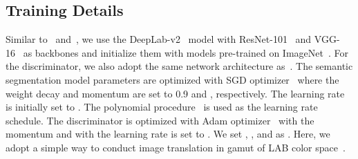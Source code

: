 \subsection{Training Details}
Similar to~\cite{tsai2018learning} and~\cite{vu2019advent}, we use the DeepLab-v2~\cite{chen2017deeplab} model with ResNet-101~\cite{he2016deep} and VGG-16~\cite{simonyan2014very} as backbones and initialize them with models pre-trained on ImageNet~\cite{deng2009imagenet}. For the discriminator, we also adopt the same network architecture as~\cite{tsai2018learning,vu2019advent}. The semantic segmentation model parameters are optimized with SGD optimizer~\cite{bottou2010large} where the weight decay and momentum are set
to 0.9 and , respectively. The learning rate is initially set to . The polynomial procedure~\cite{chen2017deeplab} is used as the learning rate schedule. The discriminator is optimized with Adam optimizer~\cite{kingma2014adam} with the momentum  and  with the learning rate is set to . We set , ,  and  as . Here, we adopt a simple way to conduct image translation in gamut of LAB color space~\cite{reinhard2001color}.

